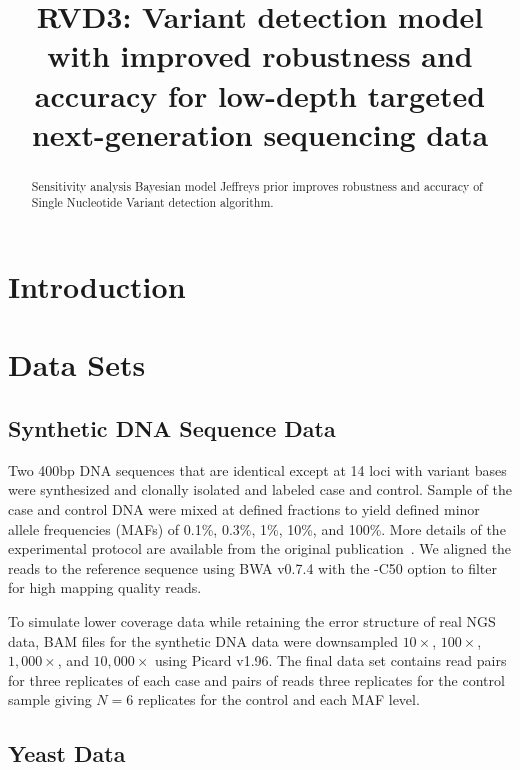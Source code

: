 \documentclass[11pt,reqno]{amsart}
\title[RVD3]{RVD3: Variant detection model with improved robustness and accuracy for low-depth targeted next-generation sequencing data}
\author{}
\begin{document}
\begin{abstract}
Sensitivity analysis Bayesian model
Jeffreys prior improves robustness and accuracy of Single Nucleotide Variant detection algorithm.

\end{abstract}

\maketitle

\section{Introduction}





\section{Data Sets}

\subsection{Synthetic DNA Sequence Data}

Two 400bp DNA sequences that are identical except at 14 loci with variant bases were synthesized and clonally isolated and labeled case and control. Sample of the case and control DNA were mixed at defined fractions to yield defined minor allele frequencies (MAFs) of 0.1\%, 0.3\%, 1\%, 10\%, and 100\%. More details of the experimental protocol are available from the original publication~\citep{Flaherty:2011ja}. We aligned the reads to the reference sequence using BWA v0.7.4 with the -C50 option to filter for high mapping quality reads.

To simulate lower coverage data while retaining the error structure of real NGS data, BAM files for the synthetic DNA data were downsampled $10\times$, $100\times$, $1,000\times$, and $10,000\times$ using Picard v1.96. The final data set contains read pairs for three replicates of each case and pairs of reads three replicates for the control sample giving $N=6$ replicates for the control and each MAF level.

\subsection{Yeast Data}
\end{document}
